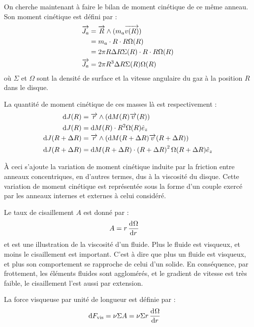 \bigskip

On cherche maintenant à faire le bilan de moment cinétique de ce même anneau. Son moment cinétique est défini par :
\begin{align}
\vect{J_a} &= \vect{R} \wedge (m_a\vect{v(R)}) \nonumber\\
&= m_a \cdot R \cdot R\Omega(R)\nonumber\\
&= 2\pi R \Delta R \Sigma(R)\cdot R \cdot R\Omega(R)\nonumber\\
\vect{J_a} &= 2\pi R^3 \Delta R \Sigma(R)\Omega(R)\label{eq:J_a}
\end{align}
où $\Sigma$ et $\Omega$ sont la densité de surface et la vitesse angulaire du gaz à la position $R$ dans le disque.

La quantité de moment cinétique de ces masses là est respectivement :
\begin{subequations}
\begin{align}
\dif J(R) &= \vect{r} \wedge \left(\dif M(R) \vect{v}(R)\right)\nonumber\\
\dif J(R) &= \dif M(R) \cdot R^2\Omega(R)\hat{e}_z\label{eq:dJ_in}\\
\dif J(R+\Delta R) &= \vect{r} \wedge \left(\dif M(R+\Delta R) \vect{v}(R+\Delta R)\right)\nonumber\\
\dif J(R+\Delta R) &= \dif M(R+\Delta R) \cdot \left(R+\Delta R\right)^2\Omega(R+\Delta R)\hat{e}_z\label{eq:dJ_out}
\end{align}\label{eq:dJ}
\end{subequations}

\bigskip

À ceci s'ajoute la variation de moment cinétique induite par la friction entre anneaux concentriques, en d'autres termes, dus à la viscosité du disque. Cette variation de moment cinétique est représentée sous la forme d'un couple exercé par les anneaux internes et externes à celui considéré. 

Le taux de cisaillement $A$ est donné par : 
\begin{align}
A &= r \mathinner{ \dfrac{\operatorname{d \!}{^{}}\Omega}{\operatorname{d \!}{{r}^{}}} }
\end{align}
et est une illustration de la viscosité d'un fluide. Plus le fluide est visqueux, et moins le cisaillement est important. C'est à dire que plus un fluide est visqueux, et plus son comportement se rapproche de celui d'un solide. En conséquence, par frottement, les éléments fluides sont agglomérés, et le gradient de vitesse est très faible, le cisaillement l'est aussi par extension. 

La force visqueuse par unité de longueur est définie par :
\begin{align}
\operatorname{d \!} F_\text{vis} &= \nu \Sigma A = \nu \Sigma r \mathinner{ \dfrac{\operatorname{d \!}{^{}}\Omega}{\operatorname{d \!}{{r}^{}}} }
\end{align}


